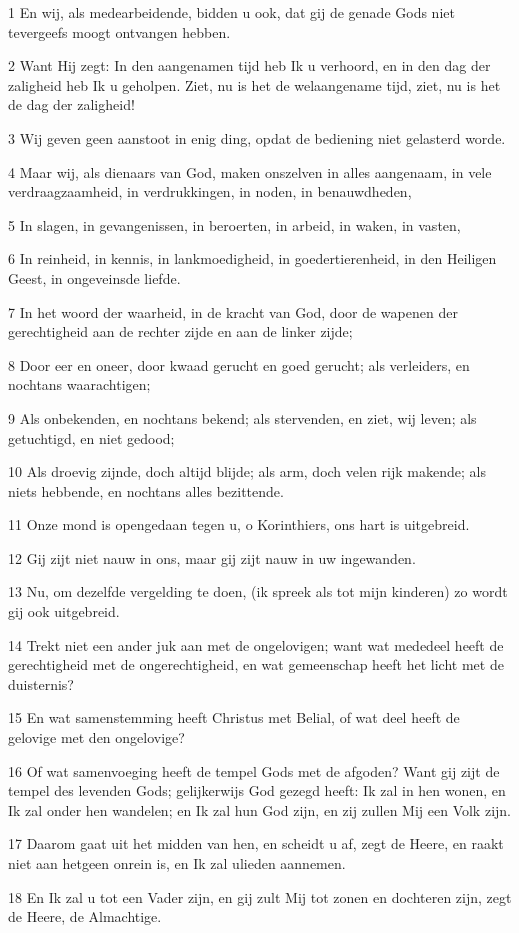 \par 1 En wij, als medearbeidende, bidden u ook, dat gij de genade Gods niet tevergeefs moogt ontvangen hebben.
\par 2 Want Hij zegt: In den aangenamen tijd heb Ik u verhoord, en in den dag der zaligheid heb Ik u geholpen. Ziet, nu is het de welaangename tijd, ziet, nu is het de dag der zaligheid!
\par 3 Wij geven geen aanstoot in enig ding, opdat de bediening niet gelasterd worde.
\par 4 Maar wij, als dienaars van God, maken onszelven in alles aangenaam, in vele verdraagzaamheid, in verdrukkingen, in noden, in benauwdheden,
\par 5 In slagen, in gevangenissen, in beroerten, in arbeid, in waken, in vasten,
\par 6 In reinheid, in kennis, in lankmoedigheid, in goedertierenheid, in den Heiligen Geest, in ongeveinsde liefde.
\par 7 In het woord der waarheid, in de kracht van God, door de wapenen der gerechtigheid aan de rechter zijde en aan de linker zijde;
\par 8 Door eer en oneer, door kwaad gerucht en goed gerucht; als verleiders, en nochtans waarachtigen;
\par 9 Als onbekenden, en nochtans bekend; als stervenden, en ziet, wij leven; als getuchtigd, en niet gedood;
\par 10 Als droevig zijnde, doch altijd blijde; als arm, doch velen rijk makende; als niets hebbende, en nochtans alles bezittende.
\par 11 Onze mond is opengedaan tegen u, o Korinthiers, ons hart is uitgebreid.
\par 12 Gij zijt niet nauw in ons, maar gij zijt nauw in uw ingewanden.
\par 13 Nu, om dezelfde vergelding te doen, (ik spreek als tot mijn kinderen) zo wordt gij ook uitgebreid.
\par 14 Trekt niet een ander juk aan met de ongelovigen; want wat mededeel heeft de gerechtigheid met de ongerechtigheid, en wat gemeenschap heeft het licht met de duisternis?
\par 15 En wat samenstemming heeft Christus met Belial, of wat deel heeft de gelovige met den ongelovige?
\par 16 Of wat samenvoeging heeft de tempel Gods met de afgoden? Want gij zijt de tempel des levenden Gods; gelijkerwijs God gezegd heeft: Ik zal in hen wonen, en Ik zal onder hen wandelen; en Ik zal hun God zijn, en zij zullen Mij een Volk zijn.
\par 17 Daarom gaat uit het midden van hen, en scheidt u af, zegt de Heere, en raakt niet aan hetgeen onrein is, en Ik zal ulieden aannemen.
\par 18 En Ik zal u tot een Vader zijn, en gij zult Mij tot zonen en dochteren zijn, zegt de Heere, de Almachtige.

